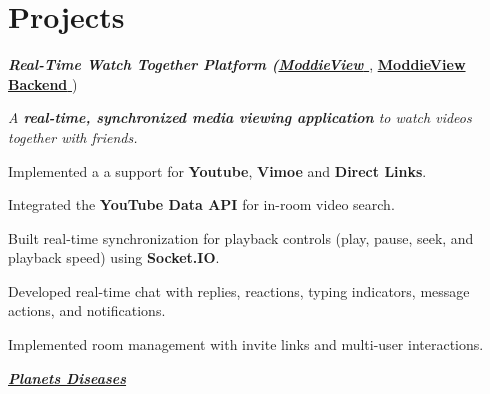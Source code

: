\section{Projects}
    {\textcolor{linkColor}{\textit{\textbf{Real-Time Watch Together Platform (\href{https://github.com/ahmniab/ModdieView.git}\textbf{ModdieView }}}, \href{https://github.com/ahmniab/Moddie-View-Backend}{\textcolor{linkColor}{\textbf{ModdieView Backend }}})}}
\vspace{0.10 cm}
\begin{onecolentry}
   \textit{A \textbf{real-time, synchronized media viewing application} to watch videos together with friends. }
    \begin{highlights}
        \item Implemented a a support for \textbf{Youtube}, \textbf{Vimoe} and \textbf{Direct Links}.
        \item Integrated the \textbf{YouTube Data API} for in-room video search.
        \item Built real-time synchronization for playback controls (play, pause, seek, and playback speed) using \textbf{Socket.IO}.
        \item Developed real-time chat with replies, reactions, typing indicators, message actions, and notifications.
        \item Implemented room management with invite links and multi-user interactions.
    \end{highlights}
\end{onecolentry}

\vspace{0.5 cm}
\newpage

    \textit{\href{https://github.com/ahmniab/planets-diseases.git}{\textcolor{linkColor}{\textbf{Planets Diseases }}}}
    

